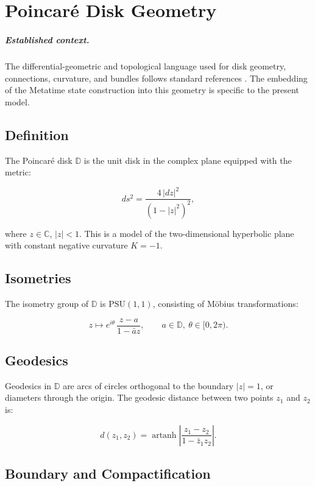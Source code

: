 \chapter{Poincar\'{e} Disk Geometry}
\label{app:poincare}

\paragraph{Established context.}
The differential-geometric and topological language used for disk geometry,
connections, curvature, and bundles follows standard references
\cite{KobayashiNomizu1963,BottTu1982,Nakahara2003}.  The embedding of the
Metatime state construction into this geometry is specific to the present model.

\section{Definition}

The Poincar\'{e} disk $\mathbb{D}$ is the unit disk in the complex plane
equipped with the metric:

\[
ds^2 = \frac{4\,|dz|^2}{(1 - |z|^2)^2},
\]

where $z \in \mathbb{C}$, $|z| < 1$.  This is a model of the
two-dimensional hyperbolic plane with constant negative curvature
$K = -1$.

\section{Isometries}

The isometry group of $\mathbb{D}$ is $\text{PSU}(1,1)$, consisting of
M\"{o}bius transformations:

\[
z \mapsto e^{i\theta}\,\frac{z - a}{1 - \bar{a}z},
\qquad a \in \mathbb{D},\ \theta \in [0,2\pi).
\]

\section{Geodesics}

Geodesics in $\mathbb{D}$ are arcs of circles orthogonal to the boundary
$|z| = 1$, or diameters through the origin.  The geodesic distance between
two points $z_1$ and $z_2$ is:

\[
d(z_1, z_2) = \operatorname{artanh}\left|
\frac{z_1 - z_2}{1 - \bar{z}_1 z_2}
\right|.
\]

\section{Boundary and Compactification}

